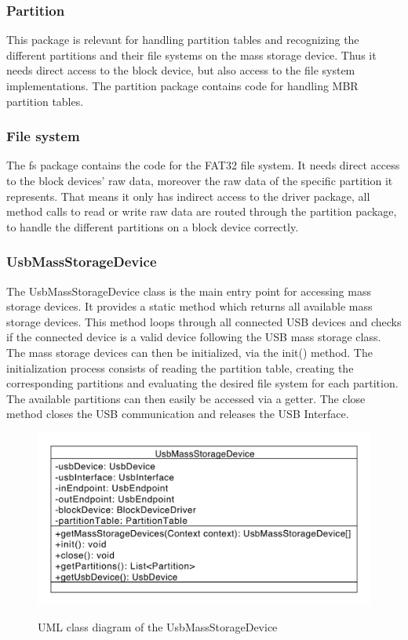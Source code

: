 \subsubsection{Partition}

This package is relevant for handling partition tables and recognizing the different partitions and their file systems on the mass storage device. Thus it needs direct access to the block device, but also access to the file system implementations. The partition package contains code for handling MBR partition tables.

\subsubsection{File system}

The fs package contains the code for the FAT32 file system. It needs direct access to the block devices' raw data, moreover the raw data of the specific partition it represents. That means it only has indirect access to the driver package, all method calls to read or write raw data are routed through the partition package, to handle the different partitions on a block device correctly.

\subsubsection{UsbMassStorageDevice}

The UsbMassStorageDevice class is the main entry point for accessing mass storage devices. It provides a static method which returns all available mass storage devices. This method loops through all connected USB devices and checks if the connected device is a valid device following the USB mass storage class. The mass storage devices can then be initialized, via the init() method. The initialization process consists of reading the partition table, creating the corresponding partitions and evaluating the desired file system for each partition.  The available partitions can then easily be accessed via a getter. The close method closes the USB communication and releases the USB Interface.

\begin{figure}[h!]
\caption{UML class diagram of the UsbMassStorageDevice}
\centering
\includegraphics[scale=0.85]{figures/usb_mass_dev}
\label{figure:mass_dev}
\end{figure}

